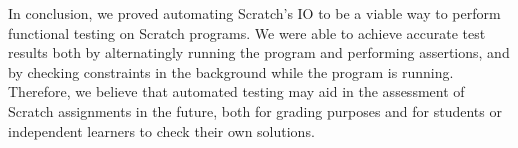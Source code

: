 In conclusion, we proved automating Scratch's IO to be a viable way to perform functional testing on Scratch programs.
We were able to achieve accurate test results both by alternatingly running the program and performing assertions, and by checking constraints in the background while the program is running.
Therefore, we believe that automated testing may aid in the assessment of Scratch assignments in the future,
both for grading purposes and for students or independent learners to check their own solutions.

